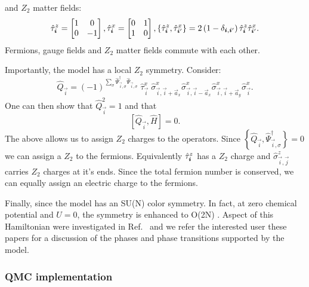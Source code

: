 and  $Z_2$ matter fields:
\begin{align}
 \hat{\tau}_{\boldsymbol{i}}^{z} = 
\begin{bmatrix}
1 & 0 \\
0 & -1 
\end{bmatrix},  
\hat{\tau}^{x}_{\boldsymbol{i} }  = 
\begin{bmatrix}
0 & 1 \\
1 & 0 
\end{bmatrix}, 
\left\{ \hat{\tau}^{z}_{ \boldsymbol{i} } , \hat{\tau}^x_{\boldsymbol{i}'} \right\}  =  2 \left( 1 -  \delta_{ \boldsymbol{i}, \boldsymbol{i}' } \right) 
\hat{\tau}^{z}_{ \boldsymbol{i} }  \hat{\tau}^x_{ \boldsymbol{i}' }.
\end{align}
 Fermions,  gauge fields and $Z_2$ matter fields commute with each other. 
 
 Importantly,  the model has a local  $Z_2$ symmetry. Consider:
\begin{equation}
	\hat{Q}_{\vec{i}} =  (-1)^{\sum_{\sigma} \hat{\Psi}^{\dagger}_{\vec{i},\sigma} \hat{\Psi}^{\phantom{\dagger}}_{\vec{i},\sigma}   } 
	\;  \hat{\tau}^{x}_{\vec{i}}  \; \hat{\sigma}^{x}_{\vec{i},\vec{i} +  \vec{a}_x} \hat{\sigma}^{x}_{\vec{i},\vec{i} -  \vec{a}_x} \hat{\sigma}^{x}_{\vec{i},\vec{i} +  \vec{a}_y} \hat{\sigma}^{x}_{\vec{i}}.
\end{equation} 
One can  then show that  $\hat{Q}_{\vec{i}}^2 = 1 $ and that
\begin{equation}
	\left[   \hat{Q}_{\vec{i}}, \hat{H}  \right]  = 0. 
\end{equation} 
The above allows us to assign $Z_2$  charges to the operators.   Since $ \left\{ \hat{Q}_{\vec{i}},   \hat{\Psi}^{\dagger}_{\vec{i},\sigma} \right\} =    0 $ we can assign a $Z_2$ to the fermions.  Equivalently 
$\hat{\tau}^{z}_{\boldsymbol{i}}$   has a $Z_2$ charge and $\hat{\sigma}^{z}_{\vec{i},\vec{j}} $   carries  $Z_2$ charges at it's ends.   
 Since the total fermion number is conserved,   we can equally assign an electric charge to the  fermions.  

 Finally, since  the model has an SU(N) color symmetry.  In fact, at zero chemical potential and $U=0$,    the symmetry is enhanced to O(2N) \cite{Assaad16}.
Aspect of this Hamiltonian were investigated in Ref.~\cite{Assaad16,Gazit16,Gazit18,Gazit19,Hohenadler18,Hohenadler19}  and we refer  the interested user these papers for a discussion of the phases and phase transitions supported by the model.  

\subsubsection*{ QMC implementation } 

